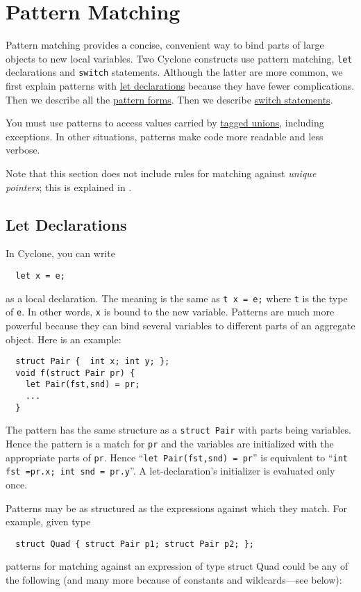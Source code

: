 \section{Pattern Matching}
\label{sec:patterns}

Pattern matching provides a concise, convenient way to bind parts of
large objects to new local variables.  Two Cyclone constructs use
pattern matching, \texttt{let} declarations and \texttt{switch} statements.  Although
the latter are more common, we first explain patterns with
\hyperlink{let_decls}{let declarations} because they have fewer
complications.  Then we describe all the \hyperlink{pat_forms}{pattern
  forms}.  Then we describe \hyperlink{switch_stmt}{switch
  statements}.

You must use patterns to access values carried by
\hyperref[{sec:taggedunions}]{tagged unions}, including exceptions.  In
other situations, patterns make code more readable and less verbose.

Note that this section does not include rules for matching against
  \emph{unique pointers}; this is explained in
  .

\subsection{Let Declarations}\hypertarget{let_decls}{}

In Cyclone, you can write
\begin{verbatim}
  let x = e;
\end{verbatim}
as a local declaration.  The meaning is the same as \texttt{t x = e;}
where \texttt{t} is the type of \texttt{e}.  In other words,
\texttt{x} is bound to the new variable.  Patterns are much more
powerful because they can bind several variables to different parts of
an aggregate object.  Here is an example:
\begin{verbatim}
  struct Pair {  int x; int y; };
  void f(struct Pair pr) {
    let Pair(fst,snd) = pr;
    ...
  }
\end{verbatim}

The pattern has the same structure as a \texttt{struct Pair} with parts
being variables.  Hence the pattern is a match for \texttt{pr} and the
variables are initialized with the appropriate parts of \texttt{pr}.  Hence
``\texttt{let Pair(fst,snd) = pr}'' is equivalent to
``\texttt{int fst =pr.x; int snd = pr.y}''.  A let-declaration's
initializer is evaluated only once.

Patterns may be as structured as the expressions against which they
match.  For example, given type
\begin{verbatim}
  struct Quad { struct Pair p1; struct Pair p2; };
\end{verbatim}
patterns for matching against an expression of type struct Quad could
be any of the following (and many more because of constants and
wildcards---see below):

